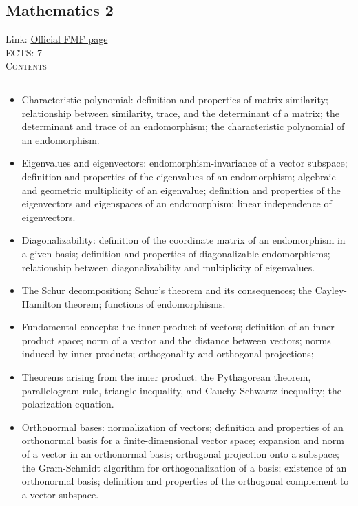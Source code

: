 \documentclass[11pt, a4paper]{article}
\newenvironment{course}[3]{
\subsection{#1}%
Link: \href{#2}{Official FMF page}\\%
ECTS: #3%
\vspace{1ex}
\\
{\large \textsc{Contents}}\\[-0.9ex]%
\rule{\textwidth}{0.5pt}
\vspace{-3ex}
}
{}
\newenvironment{chapter}[1]{
\begin{tcolorbox}[title=#1, breakable]
}
{\end{tcolorbox}}
\begin{document}
\begin{course}{Mathematics 2}{https://www.fmf.uni-lj.si/en/study-physics/programmes/1fiz/2020/7000777/courses/521/}{7}
    \begin{chapter}{Endomorphisms of vector spaces}
        \begin{itemize}
            \item Characteristic polynomial: definition and properties of matrix similarity; relationship between similarity, trace, and the determinant of a matrix; the determinant and trace of an endomorphism; the characteristic polynomial of an endomorphism.

            \item Eigenvalues and eigenvectors: endomorphism-invariance of a vector subspace; definition and properties of the eigenvalues of an endomorphism; algebraic and geometric multiplicity of an eigenvalue; definition and properties of the eigenvectors and eigenspaces of an endomorphism; linear independence of eigenvectors.

            \item Diagonalizability: definition of the coordinate matrix of an endomorphism in a given basis; definition and properties of diagonalizable endomorphisms; relationship between diagonalizability and multiplicity of eigenvalues.

            \item The Schur decomposition; Schur's theorem and its consequences; the Cayley-Hamilton theorem; functions of endomorphisms.
        
        \end{itemize}
    \end{chapter}

    \begin{chapter}{Inner product spaces}
        \begin{itemize}
        
            \item Fundamental concepts: the inner product of vectors; definition of an inner product space; norm of a vector and the distance between vectors; norms induced by inner products; orthogonality and orthogonal projections;

            \item Theorems arising from the inner product: the Pythagorean theorem, parallelogram rule, triangle inequality, and Cauchy-Schwartz inequality; the polarization equation.

            \item Orthonormal bases: normalization of vectors; definition and properties of an orthonormal basis for a finite-dimensional vector space; expansion and norm of a vector in an orthonormal basis; orthogonal projection onto a subspace; the Gram-Schmidt algorithm for orthogonalization of a basis; existence of an orthonormal basis; definition and properties of the orthogonal complement to a vector subspace.


\end{itemize}
\end{chapter}
\end{course}
\end{document}
